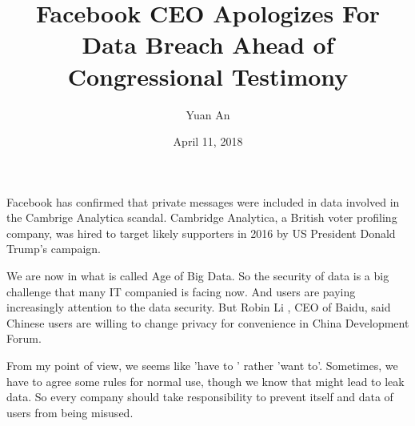 \documentclass[a4paper,12pt]{article}
\begin{document}
\title{Facebook CEO Apologizes For Data Breach Ahead of Congressional Testimony}
\author{Yuan An}
\date{April 11, 2018}
\maketitle
Facebook has confirmed that private messages were included in data involved in the Cambrige Analytica scandal. Cambridge Analytica, a British voter profiling company, was hired to target likely supporters in 2016 by US President Donald Trump's campaign.
\par
We are now in what is called Age of Big Data. So the security of data is a big challenge that many IT companied is facing now. And users are paying increasingly attention to the data security. But Robin Li , CEO of Baidu, said Chinese users are willing to change privacy for convenience in China Development Forum. 
\par
From my point of view, we seems like 'have to ' rather 'want to'. Sometimes, we have to agree some rules for normal use, though we know that might lead to leak data. So every company should take responsibility to prevent itself and data of users from being misused. 
\end{document}
